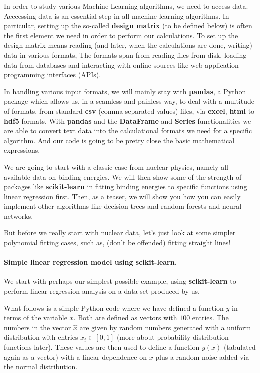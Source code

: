 \documentclass[%
oneside,                 %
final,                   %
10pt]{article}
\begin{document}
In order to study various Machine Learning algorithms, we need to
access data. Acccessing data is an essential step in all machine
learning algorithms. In particular, setting up the so-called \textbf{design
matrix} (to be defined below) is often the first element we need in
order to perform our calculations. To set up the design matrix means
reading (and later, when the calculations are done, writing) data
in various formats, The formats span from reading files from disk,
loading data from databases and interacting with online sources
like web application programming interfaces (APIs).

In handling various input formats, we will mainly stay with \textbf{pandas},
a Python package which allows us, in a seamless and painless way, to
deal with a multitude of formats, from standard \textbf{csv} (comma separated
values) files, via \textbf{excel}, \textbf{html} to \textbf{hdf5} formats.  With \textbf{pandas}
and the \textbf{DataFrame}  and \textbf{Series} functionalities we are able to convert text data
into the calculational formats we need for a specific algorithm. And our code is going to be 
pretty close the basic mathematical expressions.

We are going to start with a classic case from nuclear physics, namely all
available data on binding energies. We will then show some of the
strength of packages like \textbf{scikit-learn} in fitting binding energies to
specific functions using linear regression first. Then, as a teaser, we will show you how 
you can easily implement other algorithms like decision trees and random forests and neural networks.

But before we really start with nuclear data, let's just look at some simpler polynomial fitting cases, such as,
(don't be offended) fitting straight lines!


\paragraph{Simple linear regression model using \textbf{scikit-learn}.}
We start with perhaps our simplest possible example, using \textbf{scikit-learn} to perform linear regression analysis on a data set produced by us. 

What follows is a simple Python code where we have defined a function
$y$ in terms of the variable $x$. Both are defined as vectors with  $100$ entries. 
The numbers in the vector $\hat{x}$ are given
by random numbers generated with a uniform distribution with entries
$x_i \in [0,1]$ (more about probability distribution functions
later). These values are then used to define a function $y(x)$
(tabulated again as a vector) with a linear dependence on $x$ plus a
random noise added via the normal distribution.
\end{document}

